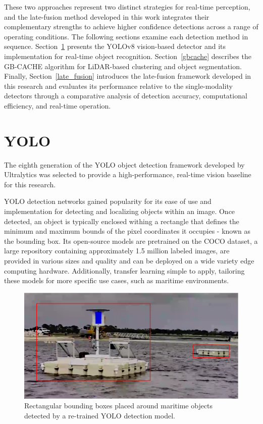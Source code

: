 \documentclass{erauthesis}
\begin{document}
These two approaches represent two distinct strategies for real-time perception, and the late-fusion method developed in this work integrates their complementary strengths to achieve higher confidence detections across a range of operating conditions.
The following sections examine each detection method in sequence.
Section~\ref{yolo} presents the YOLOv8 vision-based detector and its implementation for real-time object recognition.
Section~\ref{gbcache} describes the GB-CACHE algorithm for LiDAR-based clustering and object segmentation.
Finally, Section~\ref{late_fusion} introduces the late-fusion framework developed in this research and evaluates its performance relative to the single-modality detectors through a comparative analysis of detection accuracy, computational efficiency, and real-time operation.

\section{YOLO}
\label{yolo}
The eighth generation of the \ac{YOLO} object detection framework developed by Ultralytics was selected to provide a high-performance, real-time vision baseline for this research. 


YOLO detection networks gained popularity for its ease of use and implementation for detecting and localizing objects within an image.
Once detected, an object is typically enclosed withing a rectangle that defines the minimum and maximum bounds of the pixel coordinates it occupies - known as the bounding box.
Its open-source models are pretrained on the COCO dataset, a large repository containing approximately 1.5 million labeled images, are provided in various sizes and quality and can be deployed on a wide variety edge computing hardware.
Additionally, transfer learning simple to apply, tailoring these models for more specific use cases, such as maritime environments.

\begin{figure}
    \centering
    \includegraphics[width=0.5\linewidth]{Images/YOLO_ex1.png}
    \caption{Rectangular bounding boxes placed around maritime objects detected by a re-trained YOLO detection model.}
    \label{fig:YOLO_tower}
\end{figure}
\end{document}
